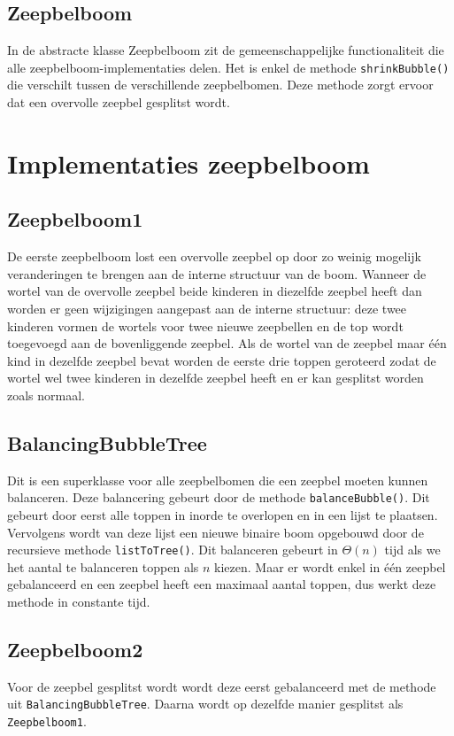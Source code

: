 \documentclass[12pt,hidelinks]{article}
\begin{document}
    \subsection{Zeepbelboom}
    In de abstracte klasse Zeepbelboom zit de gemeenschappelijke functionaliteit die
    alle zeepbelboom-implementaties delen. Het is enkel de methode {\tt shrinkBubble()}
    die verschilt tussen de verschillende zeepbelbomen. Deze methode zorgt ervoor dat een 
    overvolle zeepbel gesplitst wordt.

    \section{Implementaties zeepbelboom}
    \subsection{Zeepbelboom1}
    De eerste zeepbelboom  lost een overvolle zeepbel op door zo weinig mogelijk
    veranderingen te brengen aan de interne structuur van de boom. Wanneer de wortel van
    de overvolle zeepbel beide kinderen in diezelfde zeepbel heeft dan worden er geen
    wijzigingen aangepast aan de interne structuur: deze twee kinderen vormen de wortels
    voor twee nieuwe zeepbellen en de top wordt toegevoegd aan de bovenliggende zeepbel.
    Als de wortel van de zeepbel maar één kind in dezelfde zeepbel bevat worden de
    eerste drie toppen geroteerd zodat de wortel wel twee kinderen in dezelfde zeepbel
    heeft en er kan gesplitst worden zoals normaal.
    \subsection{BalancingBubbleTree}
    Dit is een superklasse voor alle zeepbelbomen die een zeepbel moeten kunnen balanceren.
    Deze balancering gebeurt door de methode {\tt balanceBubble()}. Dit gebeurt door eerst 
    alle toppen in inorde te overlopen en in een lijst te plaatsen.
    Vervolgens wordt van deze lijst een nieuwe binaire boom opgebouwd door de recursieve
    methode {\tt listToTree()}. Dit balanceren gebeurt in $\Theta (n)$ tijd als we het
    aantal te balanceren toppen als $n$ kiezen. Maar er wordt enkel in één zeepbel
    gebalanceerd en een zeepbel heeft een maximaal aantal toppen, dus werkt deze methode
    in constante tijd.   
    \subsection{Zeepbelboom2}
    Voor de zeepbel gesplitst wordt wordt deze eerst gebalanceerd met de methode
    uit {\tt BalancingBubbleTree}. Daarna wordt op dezelfde manier gesplitst als
    {\tt Zeepbelboom1}.
\end{document}
